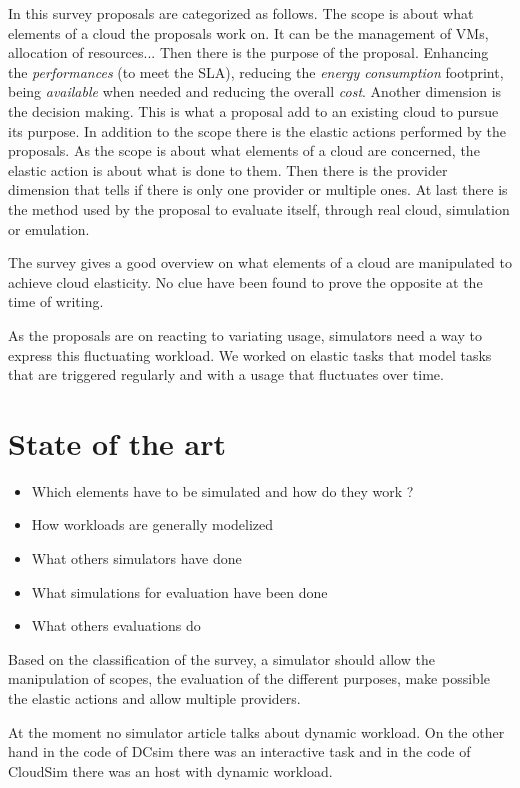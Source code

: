 \documentclass[a4paper]{IEEEtran}
\begin{document}
  In this survey proposals are categorized as follows. The scope is about what
  elements of a cloud the proposals work on. It can be the management of VMs,
  allocation of resources... Then there is the purpose of the proposal.
  Enhancing the \textit{performances} (to meet the SLA), reducing the
  \textit{energy consumption} footprint, being \textit{available} when needed
  and reducing the overall \textit{cost}. Another dimension is the decision
  making. This is what a proposal add to an existing cloud to pursue its
  purpose. In addition to the scope there is the elastic actions performed by
  the proposals. As the scope is about what elements of a cloud are concerned,
  the elastic action is about what is done to them. Then there is the provider
  dimension that tells if there is only one provider or multiple ones. At last
  there is the method used by the proposal to evaluate itself, through real
  cloud, simulation or emulation.
  
  The survey gives a good overview on what elements of a cloud are
  manipulated to achieve cloud elasticity. No clue have been found to prove the 
  opposite at the time of writing.
  
  As the proposals are on reacting to variating usage, simulators need a way to
  express this fluctuating workload. We worked on elastic tasks that model tasks
  that are triggered regularly and with a usage that fluctuates over time.


\section{State of the art} \label{sota}
  \begin{itemize}
    \item Which elements have to be simulated and how do they work ?
    \item How workloads are generally modelized
    \item What others simulators have done
    \item What simulations for evaluation have been done
    \item What others evaluations do
  \end{itemize}
  
  Based on the classification of the survey, a simulator should allow the
  manipulation of scopes, the evaluation of the different purposes, make
  possible the elastic actions and allow multiple providers.
  
  At the moment no simulator article talks about dynamic workload. On the other
  hand in the code of DCsim \cite{tighe2013towards} there was an interactive
  task and in the code of CloudSim \cite{calheiros2011cloudsim} there was an
  host with dynamic workload.
\end{document}
